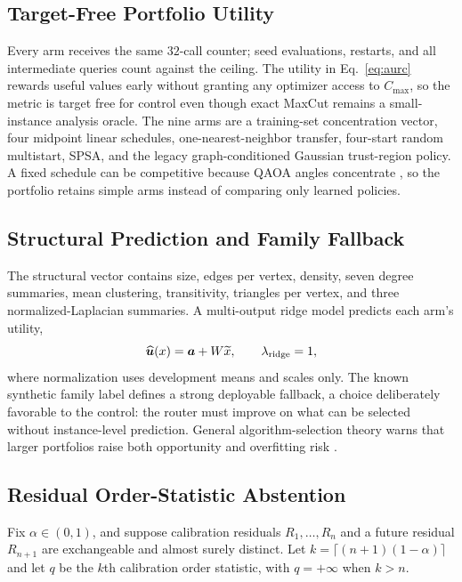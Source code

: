 \documentclass[10pt,twocolumn]{article}
\newcounter{algorithm}
\begin{document}
\subsection{Target-Free Portfolio Utility}

Every arm receives the same $32$-call counter; seed evaluations, restarts, and
all intermediate queries count against the ceiling.  The utility in
Eq.~\eqref{eq:aurc} rewards useful values early without granting any optimizer
access to $C_{\max}$, so the metric is target free for control even though exact
MaxCut remains a small-instance analysis oracle.  The nine arms are a
training-set concentration vector, four midpoint linear schedules,
one-nearest-neighbor transfer, four-start random multistart, SPSA, and the legacy
graph-conditioned Gaussian trust-region policy.  A fixed schedule can be
competitive because QAOA angles concentrate \citep{akshay2021concentration}, so
the portfolio retains simple arms instead of comparing only learned policies.

\subsection{Structural Prediction and Family Fallback}

The structural vector contains size, edges per vertex, density, seven degree
summaries, mean clustering, transitivity, triangles per vertex, and three
normalized-Laplacian summaries.  A multi-output ridge model predicts each arm's
utility,
\begin{equation}
 \widehat{\bm u}(x)=\bm a+W\widetilde x,
 \qquad \lambda_{\rm ridge}=1,
 \label{eq:ridge}
\end{equation}
where normalization uses development means and scales only.  The known synthetic
family label defines a strong deployable fallback, a choice deliberately
favorable to the control: the router must improve on what can be selected without
instance-level prediction.  General algorithm-selection theory warns that larger
portfolios raise both opportunity and overfitting risk
\citep{rice1976selection,cawley2010overfitting}.

\subsection{Residual Order-Statistic Abstention}

Fix $\alpha\in(0,1)$, and suppose calibration residuals $R_1,\dots,R_n$ and a
future residual $R_{n+1}$ are exchangeable and almost surely distinct.  Let
$k=\lceil(n+1)(1-\alpha)\rceil$ and let $q$ be the $k$th calibration order
statistic, with $q=+\infty$ when $k>n$.
\end{document}
